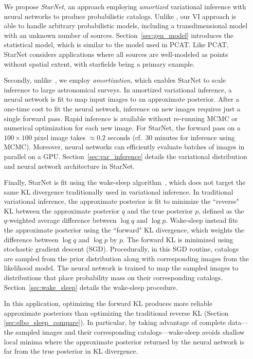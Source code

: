We propose {\itshape StarNet}, an approach employing {\itshape amortized} variational inference with neural networks to produce probabilistic catalogs. 
Unlike \cite{regier2019_celeste}, our VI approach is able to handle arbitrary probabilistic models, including a transdimensional model with an unknown number of sources. Section~\ref{sec:gen_model} introduces the statistical model, which is similar to the model used in PCAT. Like PCAT, StarNet considers applications where all sources are well-modeled as points without spatial extent, with starfields being a primary example. 

Secondly, unlike~\cite{regier2019_celeste}, 
we employ {\itshape amortization}, which enables StarNet to scale inference to large astronomical surveys. 
In amortized variational inference, a neural network is fit to map input images to an approximate posterior.
After a one-time cost to fit the neural network, inference 
on new images requires just a single forward pass.
Rapid inference is available without re-running MCMC or numerical optimization for each new image. 
For StarNet, the forward pass on 
a $100 \times 100$ pixel image takes $\approx 0.2$ seconds (cf.~30 minutes for inference using MCMC). Moreover, neural networks can efficiently evaluate batches of images in parallel on a GPU. 
Section~\ref{sec:var_inference} details the variational distribution and neural network architecture in StarNet. 

Finally, StarNet is fit using the wake-sleep algorithm~\cite{Hinton1995wake_sleep}, which does not target the same KL divergence traditionally used in  variational inference. In traditional variational inference, the approximate posterior is fit to minimize the ``reverse" KL between the approximate posterior $q$ and the true posterior $p$, defined as the $q$-weighted average difference between $\log q$ and $\log p$. 
Wake-sleep instead fits the approximate posterior using the ``forward" KL divergence, which weights the difference between $\log q$ and $\log p$ by $p$.
The forward KL is minimized using stochastic gradient descent (SGD). 
Procedurally, in this SGD routine, catalogs are sampled from the prior distribution along with corresponding images from the likelihood model. 
The neural network is trained to map the sampled images to distributions that place probability mass on their corresponding catalogs. Section~\ref{sec:wake_sleep} details the wake-sleep procedure. 

In this application, optimizing the forward KL produces more reliable approximate posteriors than optimizing the traditional reverse KL (Section \ref{sec:elbo_sleep_compare}). 
In particular, by taking advantage of complete data---the sampled images and their corresponding catalogs---wake-sleep avoids shallow local minima where the approximate posterior returned by the neural network is far from the true posterior in KL divergence. 

